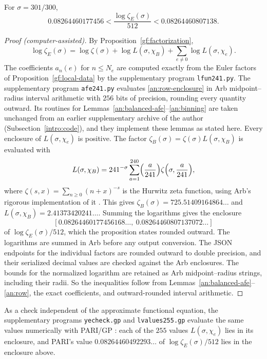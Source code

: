 \begin{proposition}\label{an:genus-value}
For $\sigma=301/300$,
\[
 0.08264460177456<\frac{\log\zeta_E(\sigma)}{512}<0.08264460807138.
\]
\end{proposition}

\begin{proof}[Proof (computer-assisted)]
By Proposition~\ref{gf:factorization},
\[
 \log\zeta_E(\sigma)=\log\zeta(\sigma)+\log L(\sigma,\chi_B)
 +\sum_{e\ne0}\log L(\sigma,\chi_e).
\]
The coefficients $a_n(e)$ for $n\le N_e$ are computed exactly from the Euler
factors of Proposition~\ref{gf:local-data} by the supplementary program
\texttt{lfun241.py}. The supplementary program \texttt{afe241.py} evaluates
\eqref{an:row-enclosure} in Arb midpoint--radius interval arithmetic
\cite{Johansson2017,FLINT} with $256$ bits of precision, rounding every
quantity outward. Its routines for
Lemmas~\ref{an:balanced-afe}--\ref{an:binning} are taken unchanged from an
earlier supplementary archive of the author (Subsection~\ref{intro:code}), and
they implement these lemmas as stated here. Every enclosure of
$L(\sigma,\chi_e)$ is positive. The factor
$\zeta_B(\sigma)=\zeta(\sigma)L(\sigma,\chi_B)$ is evaluated with
\[
 L(\sigma,\chi_B)=241^{-\sigma}\sum_{a=1}^{240}\Bigl(\frac
 a{241}\Bigr)\zeta\Bigl(\sigma,\frac a{241}\Bigr),
\]
where $\zeta(s,x)=\sum_{n\ge0}(n+x)^{-s}$ is the Hurwitz zeta function,
using Arb's rigorous implementation of it \cite{Johansson2015Hurwitz}. This
gives $\zeta_B(\sigma)=725.51409164864\ldots$ and
$L(\sigma,\chi_B)=2.41373420241\ldots$. Summing the logarithms gives the
enclosure
\[
 [0.08264460177456168\ldots,\ 0.08264460807137072\ldots]
\]
of $\log\zeta_E(\sigma)/512$, which the proposition states rounded outward.
The logarithms are summed in Arb before any output conversion. The JSON
endpoints for the individual factors are rounded outward to double
precision, and their serialized decimal values are checked against the
Arb enclosures. The bounds for the normalized logarithm are retained as
Arb midpoint--radius strings, including their radii.
So the inequalities follow from
Lemmas~\ref{an:balanced-afe}--\ref{an:row}, the exact coefficients, and
outward-rounded interval arithmetic.
\end{proof}

As a check
independent of the approximate functional equation, the supplementary
programs \texttt{yecheck.gp} and \texttt{lvalues255.gp} evaluate the same
values numerically with PARI/GP \cite{PARI}: each of the $255$ values
$L(\sigma,\chi_e)$ lies in its enclosure, and PARI's value
$0.08264460492293\ldots$ of $\log\zeta_E(\sigma)/512$ lies in the enclosure
above.

